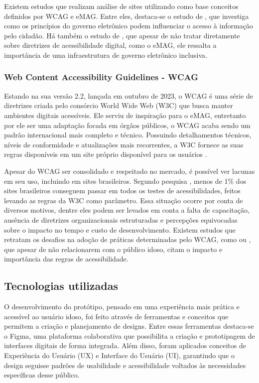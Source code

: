 
Existem estudos que realizam análise de sites utilizando como base conceitos definidos por WCAG e eMAG. Entre eles, destaca-se o estudo de \citet{xavier2024}, que investiga como os princípios do governo eletrônico podem influenciar o acesso à informação pelo cidadão. Há também o estudo de \citep{batista2025}, que apesar de não tratar diretamente sobre diretrizes de acessibilidade digital, como o eMAG, ele ressalta a importância de uma infraestrutura de governo eletrônico inclusiva.

\subsubsection{Web Content Accessibility Guidelines - WCAG}

Estando na sua versão 2.2, lançada em outubro de 2023, o WCAG é uma série de diretrizes criada pelo consórcio World Wide Web (W3C) que busca manter ambientes digitais acessíveis. Ele serviu de inspiração para o eMAG, entretanto por ele ser uma adaptação focada em órgãos públicos, o WCAG acaba sendo um padrão internacional mais completo e técnico. Possuindo detalhamentos técnicos, níveis de conformidade e atualizações mais recorrentes, a W3C fornece as suas regras disponíveis em um site próprio disponível para os usuários \citep{wcag22}.

Apesar do WCAG ser consolidado e respeitado no mercado, é possível ver lacunas em seu uso, incluindo em sites brasileiros. Segundo pesquisa \citep{mwpt2022}, menos de 1\% dos sites brasileiros conseguem passar em todos os testes de acessibilidades, feitos levando as regras da W3C como parâmetro. Essa situação ocorre por conta de diversos motivos, dentre eles podem ser levados em conta a falta de capacitação, ausência de diretrizes organizacionais estruturadas e percepções equivocadas sobre o impacto no tempo e custo de desenvolvimento. Existem estudos que retratam os desafios na adoção de práticas determinadas pelo WCAG, como \citep{loiola2025} ou \citep{anaSofia2025}, que apesar de não relacionarem com o público idoso, citam o impacto e importância das regras de acessibilidade.

\subsection*{Tecnologias utilizadas}

O desenvolvimento do protótipo, pensado em uma experiência mais prática e acessível ao usuário idoso, foi feito através de ferramentas e conceitos que permitem a criação e planejamento de designs. Entre essas ferramentas destaca-se o Figma, uma plataforma colaborativa que possibilita a criação e prototipagem de interfaces digitais de forma integrada. Além disso, foram aplicados conceitos de Experiência do Usuário (UX) e Interface do Usuário (UI), garantindo que o design seguisse padrões de usabilidade e acessibilidade voltados às necessidades específicas desse público.

